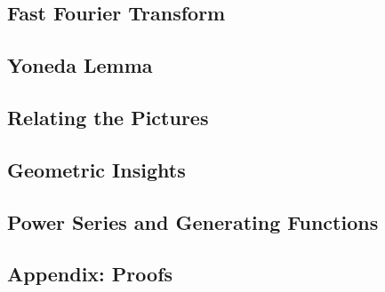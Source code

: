 \documentclass[
]{article}
\begin{document}
\hypertarget{fast-fourier-transform}{%
\subsection{Fast Fourier Transform}\label{fast-fourier-transform}}

\hypertarget{yoneda-lemma}{%
\subsection{Yoneda Lemma}\label{yoneda-lemma}}

\hypertarget{relating-the-pictures}{%
\subsection{Relating the Pictures}\label{relating-the-pictures}}

\hypertarget{geometric-insights}{%
\subsection{Geometric Insights}\label{geometric-insights}}

\hypertarget{power-series-and-generating-functions}{%
\subsection{Power Series and Generating
Functions}\label{power-series-and-generating-functions}}

\hypertarget{appendix-proofs}{%
\subsection{Appendix: Proofs}\label{appendix-proofs}}
\end{document}
